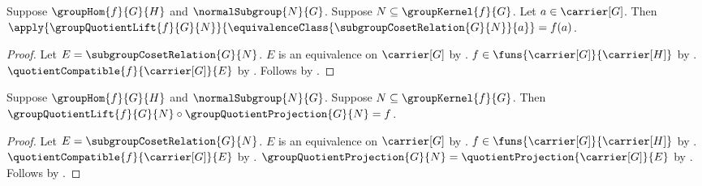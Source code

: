 \begin{proposition}\label{group_quotient_lift_apply}
    Suppose $\groupHom{f}{G}{H}$ and $\normalSubgroup{N}{G}$.
    Suppose $N\subseteq\groupKernel{f}{G}$.
    Let $a\in\carrier[G]$.
    Then
        $\apply{\groupQuotientLift{f}{G}{N}}
            {\equivalenceClass{\subgroupCosetRelation{G}{N}}{a}}
        =f(a)$.
\end{proposition}
\begin{proof}
    Let $E=\subgroupCosetRelation{G}{N}$.
    $E$ is an equivalence on $\carrier[G]$ by
        .
    $f\in\funs{\carrier[G]}{\carrier[H]}$ by
        .
    $\quotientCompatible{f}{\carrier[G]}{E}$ by
        .
    Follows by
        .
\end{proof}

\begin{theorem}\label{group_quotient_lift_factorization}
    Suppose $\groupHom{f}{G}{H}$ and $\normalSubgroup{N}{G}$.
    Suppose $N\subseteq\groupKernel{f}{G}$.
    Then
        $\groupQuotientLift{f}{G}{N}\circ
            \groupQuotientProjection{G}{N}=f$.
\end{theorem}
\begin{proof}
    Let $E=\subgroupCosetRelation{G}{N}$.
    $E$ is an equivalence on $\carrier[G]$ by
        .
    $f\in\funs{\carrier[G]}{\carrier[H]}$ by
        .
    $\quotientCompatible{f}{\carrier[G]}{E}$ by
        .
    $\groupQuotientProjection{G}{N}=
        \quotientProjection{\carrier[G]}{E}$ by
        .
    Follows by
        .
\end{proof}

